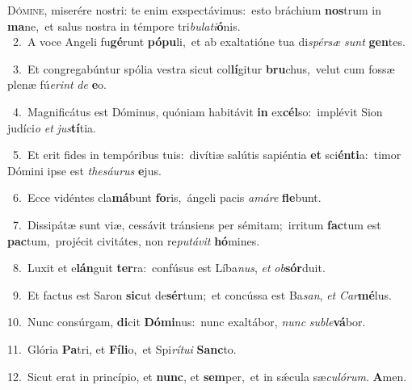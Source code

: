 \lettrine{\initial\textcolor{\initialcolor}{D}}{ómine,} miserére nostri: te enim exspectávimus:~\dagger esto bráchium \textbf{nos}\-trum in \textbf{ma}\-ne,~\star et salus nostra in témpore tri\-\textit{bu}\-\textit{la}\textit{ti}\textbf{ó}nis.\\
{\numbfont\textcolor{\numbcolor}{~2.}}~A voce Angeli fu\-\textbf{gé}\-runt \textbf{pó}\-\textbf{pu}li,~\star et ab exaltatióne tua di\-\textit{spér}\-\textit{sæ} \textit{sunt} \textbf{gen}\-tes.\par
{\numbfont\textcolor{\numbcolor}{~3.}}~Et congregabúntur spólia vestra sicut col\-\textbf{lí}\-gitur \textbf{bru}\-chus,~\star velut cum fossæ plenæ fú\-\textit{e}\-\textit{rint} \textit{de} \textbf{e}\-o.\par
{\numbfont\textcolor{\numbcolor}{~4.}}~Magnificátus est Dóminus, quóniam habitávit \textbf{in} ex\-\textbf{cél}\-so:~\star implévit Sion judíci\textit{o} \textit{et} \textit{jus}\-\textbf{tí}tia.\par
{\numbfont\textcolor{\numbcolor}{~5.}}~Et erit fides in tempóribus tuis:~\dagger divítiæ salútis sapiéntia \textbf{et} sci\-\textbf{én}\-\textbf{ti}a:~\star timor Dómini ipse est \textit{the}\-\textit{sáu}\textit{rus} \textbf{e}\-jus.\par
{\numbfont\textcolor{\numbcolor}{~6.}}~Ecce vidéntes cla\-\textbf{má}\-bunt \textbf{fo}\-ris,~\star ángeli pacis \textit{a}\-\textit{má}\textit{re} \textbf{fle}\-bunt.\par
{\numbfont\textcolor{\numbcolor}{~7.}}~Dissipátæ sunt viæ, cessávit tránsiens per sémitam;~\dagger irritum \textbf{fac}\-tum est \textbf{pac}\-tum,~\star projécit civitátes, non re\-\textit{pu}\-\textit{tá}\textit{vit} \textbf{hó}\-mines.\par
{\numbfont\textcolor{\numbcolor}{~8.}}~Luxit et e\-\textbf{lán}\-guit \textbf{ter}\-ra:~\star confúsus est Líba\-\textit{nus}\-, \textit{et} \textit{ob}\-\textbf{sór}duit.\par
{\numbfont\textcolor{\numbcolor}{~9.}}~Et factus est Saron \textbf{sic}\-ut de\-\textbf{sér}\-tum;~\star et concússa est Ba\-\textit{san}\-, \textit{et} \textit{Car}\-\textbf{mé}lus.\par
{\numbfont\textcolor{\numbcolor}{10.}}~Nunc consúrgam, \textbf{di}\-cit \textbf{Dó}\-\textbf{mi}nus:~\star nunc exaltábor, \textit{nunc} \textit{sub}\-\textit{le}\textbf{vá}bor.\par
{\numbfont\textcolor{\numbcolor}{11.}}~Glória \textbf{Pa}\-tri, et \textbf{Fí}\-\textbf{li}o,~\star et Spi\-\textit{rí}\-\textit{tu}\textit{i} \textbf{Sanc}\-to.\par
{\numbfont\textcolor{\numbcolor}{12.}}~Sicut erat in princípio, et \textbf{nunc}\-, et \textbf{sem}\-per,~\star et in sǽcula sæ\-\textit{cu}\-\textit{ló}\textit{rum}. \textbf{A}\-men.\par
